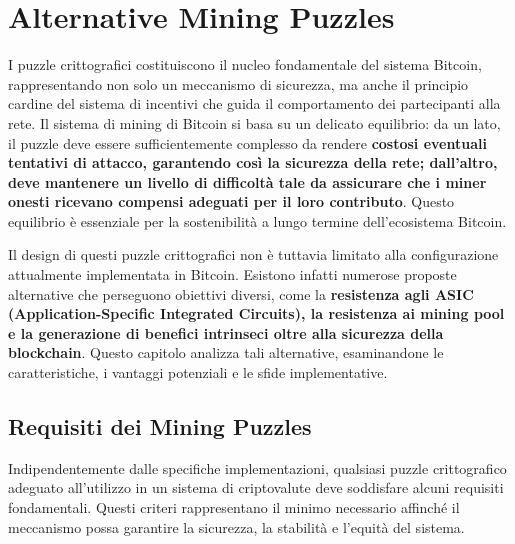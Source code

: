 \chapter{Alternative Mining Puzzles}
I puzzle crittografici costituiscono il nucleo fondamentale del sistema Bitcoin, rappresentando non solo un meccanismo di sicurezza, ma anche il principio cardine del sistema di incentivi che guida il comportamento dei partecipanti alla rete. Il sistema di mining di Bitcoin si basa su un delicato equilibrio: da un lato, il puzzle deve essere sufficientemente complesso da rendere \textbf{costosi eventuali tentativi di attacco, garantendo così la sicurezza della rete; dall'altro, deve mantenere un livello di difficoltà tale da assicurare che i miner onesti ricevano compensi adeguati per il loro contributo}. Questo equilibrio è essenziale per la sostenibilità a lungo termine dell'ecosistema Bitcoin.

Il design di questi puzzle crittografici non è tuttavia limitato alla configurazione attualmente implementata in Bitcoin. Esistono infatti numerose proposte alternative che perseguono obiettivi diversi, come la \textbf{resistenza agli ASIC (Application-Specific Integrated Circuits), la resistenza ai mining pool e la generazione di benefici intrinseci oltre alla sicurezza della blockchain}. Questo capitolo analizza tali alternative, esaminandone le caratteristiche, i vantaggi potenziali e le sfide implementative.

\section{Requisiti dei Mining Puzzles}
Indipendentemente dalle specifiche implementazioni, qualsiasi puzzle crittografico adeguato all’utilizzo in un sistema di criptovalute deve soddisfare alcuni requisiti fondamentali. Questi criteri rappresentano il minimo necessario affinché il meccanismo possa garantire la sicurezza, la stabilità e l’equità del sistema.

